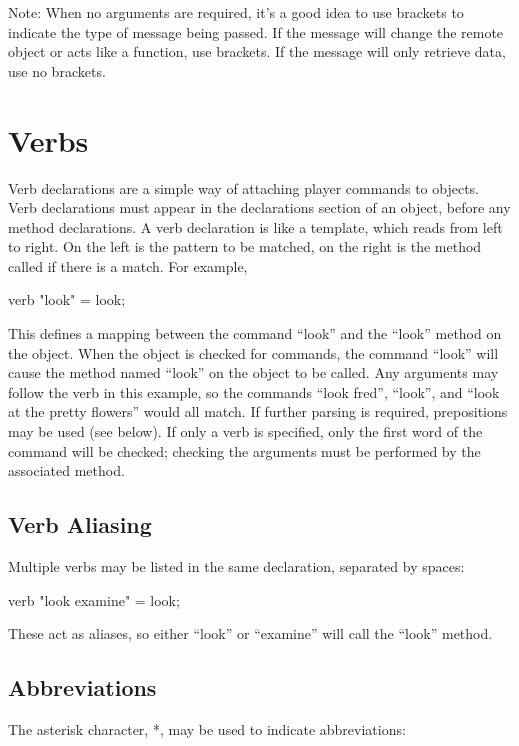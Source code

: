 Note:	When no arguments are required, it's a good idea to use brackets
	to indicate the type of message being passed.  If the message
	will change the remote object or acts like a function, use brackets.
	If the message will only retrieve data, use no brackets.

\section{Verbs}

Verb declarations are a simple way of attaching player commands to
objects.  Verb declarations must appear in the declarations section
of an object, before any method declarations.  A verb declaration
is like a template, which reads from left to right.  On the left is
the pattern to be matched, on the right is the method called if there
is a match.  For example,

\begin{code}
verb "look" = look;
\end{code}

This defines a mapping between the command ``look'' and the ``look''
method on the object.  When the object is checked for commands, the
command ``look'' will cause the method named ``look'' on the object to
be called.  Any arguments may follow the verb in this example, so
the commands ``look fred'', ``look'', and ``look at the pretty flowers''
would all match.  If further parsing is required, prepositions may
be used (see below). If only a verb is specified, only the first word of
the command will be checked; checking the arguments must be
performed by the associated method.

\subsection{Verb Aliasing}

Multiple verbs may be listed in the same declaration, separated by
spaces:

\begin{code}
verb "look examine" = look;
\end{code}

These act as aliases, so either ``look'' or ``examine'' will call the
``look'' method.

\subsection{Abbreviations}

The asterisk character, *, may be used to indicate abbreviations:

